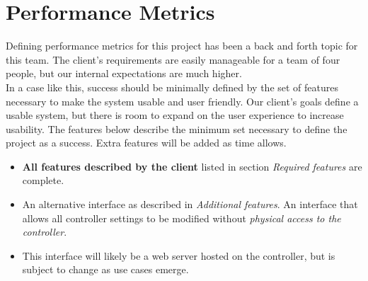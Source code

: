 \documentclass[onecolumn, draftclsnofoot,10pt, compsoc]{IEEEtran}
\begin{document}
	\section*{Performance Metrics}
	Defining performance metrics for this project has been a back and forth topic for this team. The client's requirements are easily manageable for a team of four people, but our internal expectations are much higher.
	\\In a case like this, success should be minimally defined by the set of features necessary to make the system usable and user friendly. Our client's goals define a usable system, but there is room to expand on the user experience to increase usability. The features below describe the minimum set necessary to define the project as a success. Extra features will be added as time allows.
	\begin{itemize}
		\item \textbf{All features described by the client} listed in section \textit{Required features} are complete.
		\item An alternative interface as described in \textit{Additional features}. An interface that allows all controller settings to be modified without \textit{physical access to the controller}.
		\item This interface will likely be a web server hosted on the controller, but is subject to change as use cases emerge.
	\end{itemize}
\end{document}
